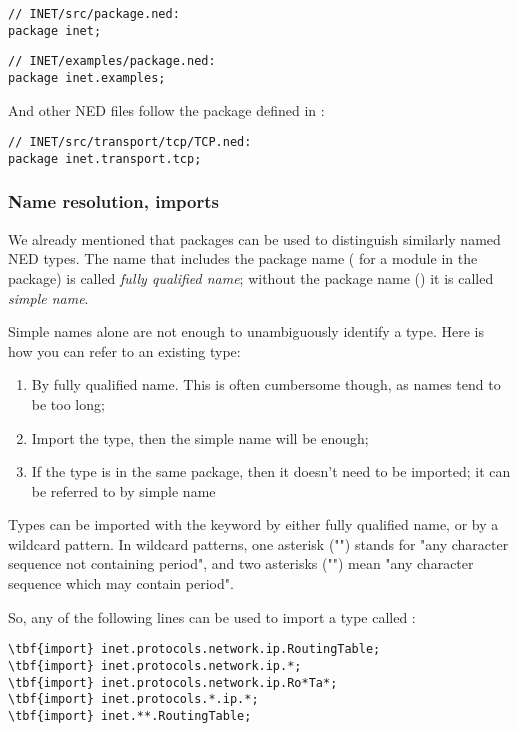 \begin{Verbatim}
// INET/src/package.ned:
package inet;
\end{Verbatim}

\begin{Verbatim}
// INET/examples/package.ned:
package inet.examples;
\end{Verbatim}

And other NED files follow the package defined in :

\begin{Verbatim}
// INET/src/transport/tcp/TCP.ned:
package inet.transport.tcp;
\end{Verbatim}


\subsubsection{Name resolution, imports}

We already mentioned that packages can be used to distinguish
similarly named NED types. The name that includes the package name
( for a  module in the 
package) is called \textit{fully qualified name}; without the package
name () it is called \textit{simple name}.

Simple names alone are not enough to unambiguously identify a type.
Here is how you can refer to an existing type:

\begin{enumerate}
  \item By fully qualified name. This is often cumbersome though,
        as names tend to be too long;
  \item Import the type, then the simple name will be enough;
  \item If the type is in the same package, then it doesn't need to be
        imported; it can be referred to by simple name
\end{enumerate}

Types can be imported with the  keyword by either
fully qualified name, or by a wildcard pattern. In wildcard patterns,
one asterisk ("\ttt{*}") stands for "any character sequence not containing
period", and two asterisks ("\ttt{**}") mean "any character sequence which may
contain period".

So, any of the following lines can be used to import a type called
:

\begin{Verbatim}[commandchars=\\\{\}]
\tbf{import} inet.protocols.network.ip.RoutingTable;
\tbf{import} inet.protocols.network.ip.*;
\tbf{import} inet.protocols.network.ip.Ro*Ta*;
\tbf{import} inet.protocols.*.ip.*;
\tbf{import} inet.**.RoutingTable;
\end{Verbatim}

